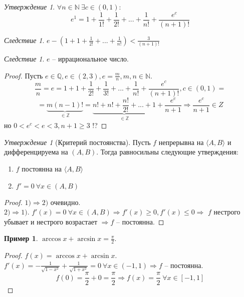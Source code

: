 \documentclass[12pt]{article}
\newenvironment{MyList}[1][4pt]{
  \begin{enumerate}[1.]
  \setlength{\parskip}{0pt}
  \setlength{\itemsep}{#1}
}{       
  \end{enumerate}
}
\def\Q{\mathbb{Q}}       %
\def\N{\mathbb{N}}       %
\def\Z{\mathbb{Z}}       %
\def\SO{\Rightarrow}     %
\theoremstyle{definition} %
\newtheorem{Example}[Thm]{Пример} %
\theoremstyle{plain} %
\theoremstyle{remark} %
\newtheorem{Cons}[Thm]{Следствие} %
\newtheorem{Prop}[Thm]{Утверждение} %
\begin{document}
\begin{Prop}
    $\forall n \in \N \ \exists c \in (0, 1) : $
    \[e^1 = 1 + \frac{1}{1!} + \frac{1}{2!} + ... + \frac{1}{n!} + \frac{e^c}{(n + 1)!}\] 
\end{Prop}

\begin{Cons}
    $e - \left(1 + 1 + \frac{1}{2!} + ... + \frac{1}{n!}\right) < \frac{3}{(n + 1)!}$ 
\end{Cons}

\begin{Cons}
    $e$ -- иррациональное число.
\end{Cons}

\begin{proof}
    Пусть $e \in \Q, e \in (2, 3), e = \frac{m}{n}, m, n \in \N$.
    \[\frac{m}{n} = e = 1 + 1 + \frac{1}{2!} + \frac{1}{3!} + ... + \frac{1}{n!} + \frac{e^c}{(n + 1)!}, c \in (0, 1) = \]
    \[= \underbrace{m (n - 1)!}_{\in \Z} = \underbrace{n! + n! + \frac{n!}{2!} + ... + 1}_{\in \Z} + \frac{e^c}{n + 1} \SO \frac{e^c}{n + 1} \in Z\]
    но $0 < e^c < e < 3, n + 1 \geqslant 3$  !?
\end{proof}


\begin{Prop}[Критерий постоянства]
    Пусть $f$ непрерывна на $\langle A, B\rangle$ и дифференцируема на $(A, B)$. Тогда равносильны следующие утверждения:
    \begin{MyList}
        \item $f$ постоянна на $\langle A, B\rangle$ 
        \item $f' = 0 \ \forall x \in (A, B)$
    \end{MyList}
\end{Prop}

\begin{proof}
    $1) \SO 2)$ очевидно. \\
    $2) \SO 1)$. $f'(x) = 0 \ \forall x \in (A, B) \SO f'(x) \geqslant 0, f'(x) \leqslant 0 \SO$ $f$ нестрого убывает и нестрого возрастает $\SO f$ -- постоянна. 
\end{proof}

\begin{Example}
    $\arccos x + \arcsin x = \frac{\pi}{2}$. 
\end{Example}

\begin{proof}
    $f(x) = \arccos x + \arcsin x$.
    $f'(x) = -\frac{1}{\sqrt{1 - x^2}} + \frac{1}{\sqrt{1 + x^2}} = 0 \ \forall x \in (-1, 1) \SO f$ -- постоянна.
    \[f(0) = \frac{\pi}{2} + 0 = \frac{\pi}{2} \SO f(x) = \frac{\pi}{2} \ \forall x \in [-1, 1]\]
\end{proof}
\end{document}
